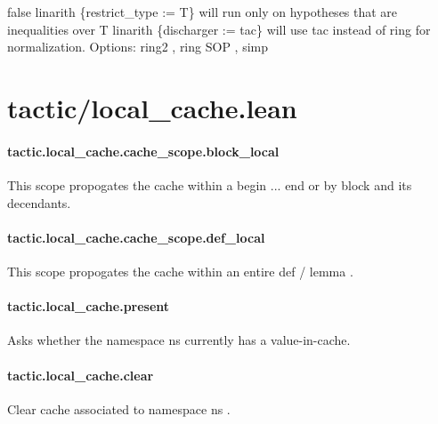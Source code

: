 \documentclass{article}
\begin{document}
\colorbox[RGB]{253,246,227}{{{{\color[RGB]{101, 123, 131} false }}}}\colorbox[RGB]{253,246,227}{{{{\color[RGB]{101, 123, 131} linarith \{restrict\_type  }}}{{{\color[RGB]{181, 137, 0} := }}}{{{\color[RGB]{101, 123, 131}  T\} }}}} will run only on hypotheses that are inequalities over 
\colorbox[RGB]{253,246,227}{{{{\color[RGB]{101, 123, 131} T }}}}\colorbox[RGB]{253,246,227}{{{{\color[RGB]{101, 123, 131} linarith \{discharger  }}}{{{\color[RGB]{181, 137, 0} := }}}{{{\color[RGB]{101, 123, 131}  tac\} }}}} will use 
\colorbox[RGB]{253,246,227}{{{{\color[RGB]{101, 123, 131} tac }}}} instead of 
\colorbox[RGB]{253,246,227}{{{{\color[RGB]{101, 123, 131} ring }}}} for normalization.
Options: 
\colorbox[RGB]{253,246,227}{{{{\color[RGB]{101, 123, 131} ring2 }}}}, 
\colorbox[RGB]{253,246,227}{{{{\color[RGB]{101, 123, 131} ring SOP }}}}, 
\colorbox[RGB]{253,246,227}{{{{\color[RGB]{101, 123, 131} simp }}}}\section{tactic/local\_cache.lean}\paragraph{tactic.local\_cache.cache\_scope.block\_local}
\par
This scope propogates the cache within a 
\colorbox[RGB]{253,246,227}{{{{\color[RGB]{133, 153, 0} begin }}}{{{\color[RGB]{101, 123, 131}  ...  }}}{{{\color[RGB]{133, 153, 0} end }}}} or 
\colorbox[RGB]{253,246,227}{{{{\color[RGB]{133, 153, 0} by }}}} block
and its decendants.
\paragraph{tactic.local\_cache.cache\_scope.def\_local}
\par
This scope propogates the cache within an entire 
\colorbox[RGB]{253,246,227}{{{{\color[RGB]{133, 153, 0} def }}}}/
\colorbox[RGB]{253,246,227}{{{{\color[RGB]{133, 153, 0} lemma }}}}.
\paragraph{tactic.local\_cache.present}
\par
Asks whether the namespace 
\colorbox[RGB]{253,246,227}{{{{\color[RGB]{101, 123, 131} ns }}}} currently has a value-in-cache.
\paragraph{tactic.local\_cache.clear}
\par
Clear cache associated to namespace 
\colorbox[RGB]{253,246,227}{{{{\color[RGB]{101, 123, 131} ns }}}}.
\end{document}
